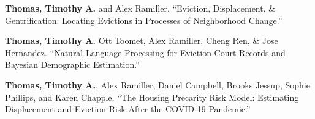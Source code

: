 







\begin{cvparagraph}

\textbf{Thomas, Timothy A.} and Alex Ramiller. “Eviction, Displacement, \& Gentrification: Locating Evictions in Processes of Neighborhood Change.”
\end{cvparagraph}

\begin{cvparagraph}

\textbf{Thomas, Timothy A.} Ott Toomet, Alex Ramiller, Cheng Ren, \& Jose Hernandez. “Natural Language Processing for Eviction Court Records and Bayesian Demographic Estimation.”
\end{cvparagraph}

\begin{cvparagraph}


\textbf{Thomas, Timothy A.}, Alex Ramiller, Daniel Campbell, Brooks Jessup, Sophie Phillips, and Karen Chapple. “The Housing Precarity Risk Model: Estimating Displacement and Eviction Risk After the COVID-19 Pandemic.”

\end{cvparagraph}


